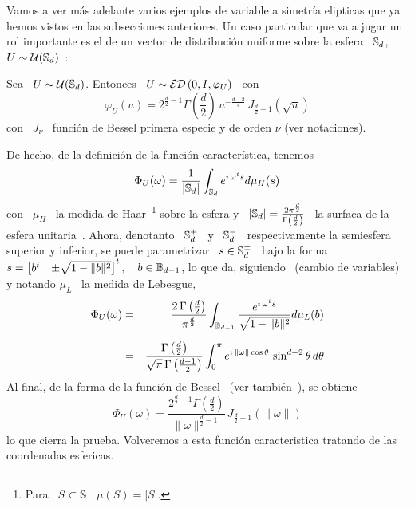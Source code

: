 Vamos a  ver m\'as adelante varios  ejemplos de variable  a simetr\'ia elipticas
que ya hemos vistos en las subsecciones anteriores.  Un caso particular que va a
jugar un rol  importante es el de un vector de  distribuci\'on uniforme sobre la
esfera \ $\mathbb{S}_d$, \ $U \sim \mathcal{U}(\mathbb{S}_d)$~\cite{FanKot90}:
%
\begin{ejemplo}\label{Ej:MP:GeneCaracUniformeEsfera}
%
  Sea \  $U \sim \mathcal{U}(\mathbb{S}_d)$. Entonces  \ $U \sim  \mathcal{ED}\left( 0 , I  , \varphi_U
  \right)$ \ con
  \[
  \varphi_U(u)   =  2^{\frac{d}{2}-1}   \Gamma\left(   \frac{d}{2}  \right)   \,
  u^{-\frac{d-2}{4}} \, J_{\frac{d}{2}-1}\left( \sqrt{u} \right)
  \]
  con \  $J_\nu$ \  funci\'on de Bessel  primera especie  y de orden  $\nu$ (ver
  notaciones).
  
  De hecho, de la definici\'on de la funci\'on caracter\'istica, tenemos
  \[
  \Phi_U(\omega) =  \frac{1}{|\mathbb{S}_d|} \int_{\mathbb{S}_d} e^{\imath  \, \omega^t s}
  d\mu_H(s)
  \]
  con \ $\mu_H$ \ la medida de Haar~\footnote{Para \ $S \subset \mathbb{S}$ \ $\mu(S)
    =    |S|$.}     sobre    la    esfera    y   \    $|\mathbb{S}_d|    =    \frac{2
    \pi^{\frac{d}{2}}}{\Gamma\left(  \frac{d}{2} \right)}$  \ la  surfaca  de la
  esfera  unitaria~\cite{GraRyz15}.   Ahora,  denotanto  \  $\mathbb{S}_d^+$  \  y  \
  $\mathbb{S}_d^-$  \ respectivamente  la semiesfera  superior y  inferior,  se puede
  parametrizar \  $s \in \mathbb{S}_d^{\pm}$ \  bajo la forma \  $s = \begin{bmatrix}
    b^t & \pm \sqrt{1-\|b\|^2} \end{bmatrix}^t, \quad b \in \mathbb{B}_{d-1}$, lo que
  da,  siguiendo~\cite[ec.~4.644]{GraRyz15}  (cambio  de  variables)  y  notando
  $\mu_L$ \ la medida de Lebesgue,
  \begin{eqnarray*}
  \Phi_U(\omega) & = & \frac{2 \, \Gamma\left( \frac{d}{2}
  \right)}{\pi^{\frac{d}{2}}} \int_{\mathbb{B}_{d-1}} \frac{e^{\imath \, \omega^t
  s}}{\sqrt{1-\|b\|^2}} d\mu_L(b)\\[2mm]
  & = & \frac{\Gamma\left( \frac{d}{2} \right)}{\sqrt{\pi} \, \Gamma\left(
  \frac{d-1}{2} \right)} \int_0^{\pi} e^{\imath \, \| \omega \| \cos\theta} \,
  \sin^{d-2}\theta \, d\theta
  \end{eqnarray*}
  Al final,  de la forma de la  funci\'on de Bessel~\cite[Ec.~8.411-7]{GraRyz15}
  (ver tambi\'en~\cite{AbrSte70, Wat22, GraMat95}), se obtiene
  \[
  \Phi_U(\omega) =  \frac{2^{\frac{d}{2}-1} \Gamma\left( \frac{d}{2} \right)}{\|
    \omega \|^{\frac{d}{2}-1}} \, J_{\frac{d}{2}-1}\left( \|\omega\| \right)
  \]
  lo que cierra  la prueba. Volveremos a esta  funci\'on caracteristica tratando
  de las coordenadas esfericas.
\end{ejemplo}

